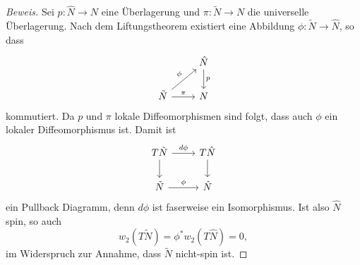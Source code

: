     \begin{proof}[Beweis]
      Sei $p \colon \hat{N} \to N$ eine Überlagerung und $\pi \colon \tilde{N} \to N$ die universelle Überlagerung.  Nach dem Liftungstheorem existiert eine Abbildung $\phi \colon \tilde{N} \to \hat{N}$, so dass 
      \[\begin{tikzcd}
      & {\hat{N}} \\
      {\tilde{N}} & N
      \arrow["p", from=1-2, to=2-2]
      \arrow["\phi", from=2-1, to=1-2]
      \arrow["\pi", from=2-1, to=2-2]
      \end{tikzcd}\]
      kommutiert. Da $p$ und $\pi$ lokale Diffeomorphismen sind folgt, dass auch $\phi$ ein lokaler Diffeomorphismus ist. Damit ist
      \[\begin{tikzcd}
      {T\tilde{N}} & {T\hat{N}} \\
      {\tilde{N}} & {\hat{N}}
      \arrow["{d\phi}", from=1-1, to=1-2]
      \arrow[from=1-1, to=2-1]
      \arrow[from=1-2, to=2-2]
      \arrow["\phi", from=2-1, to=2-2]
      \end{tikzcd}\]
      ein Pullback Diagramm, denn $d\phi$ ist faserweise ein Isomorphismus. Ist also $\hat{N}$ spin, so auch 
      \[
      w_2(T\tilde{N}) = \phi^\ast w_2(T\hat{N}) = 0,
      \] 
      im Widerspruch zur Annahme, dass $\tilde{N}$ nicht-spin ist.
    \end{proof}